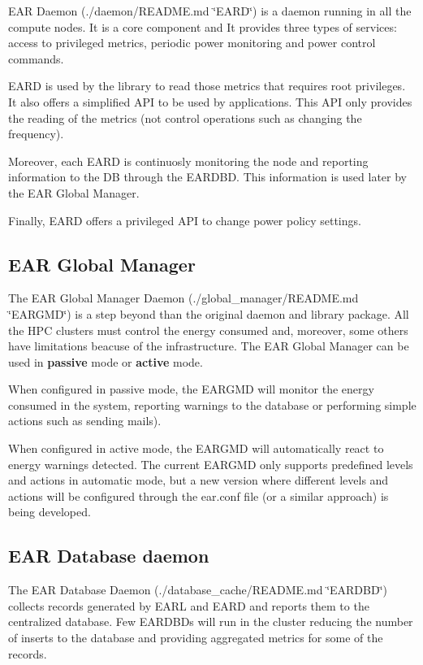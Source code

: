 E\+AR Daemon (./daemon/\+R\+E\+A\+D\+ME.md \char`\"{}\+E\+A\+R\+D\char`\"{}) is a daemon running in all the compute nodes. It is a core component and It provides three types of services\+: access to privileged metrics, periodic power monitoring and power control commands.

E\+A\+RD is used by the library to read those metrics that requires root privileges. It also offers a simplified A\+PI to be used by applications. This A\+PI only provides the reading of the metrics (not control operations such as changing the frequency).

Moreover, each E\+A\+RD is continuosly monitoring the node and reporting information to the DB through the E\+A\+R\+D\+BD. This information is used later by the E\+AR Global Manager.

Finally, E\+A\+RD offers a privileged A\+PI to change power policy settings.

\subsection*{E\+AR Global Manager}

The E\+AR Global Manager Daemon (./global\+\_\+manager/\+R\+E\+A\+D\+ME.md \char`\"{}\+E\+A\+R\+G\+M\+D\char`\"{}) is a step beyond than the original daemon and library package. All the H\+PC clusters must control the energy consumed and, moreover, some others have limitations beacuse of the infrastructure. The E\+AR Global Manager can be used in {\bfseries passive} mode or {\bfseries active} mode.

When configured in passive mode, the E\+A\+R\+G\+MD will monitor the energy consumed in the system, reporting warnings to the database or performing simple actions such as sending mails).

When configured in active mode, the E\+A\+R\+G\+MD will automatically react to energy warnings detected. The current E\+A\+R\+G\+MD only supports predefined levels and actions in automatic mode, but a new version where different levels and actions will be configured through the {\ttfamily ear.\+conf} file (or a similar approach) is being developed.

\subsection*{E\+AR Database daemon}

The E\+AR Database Daemon (./database\+\_\+cache/\+R\+E\+A\+D\+ME.md \char`\"{}\+E\+A\+R\+D\+B\+D\char`\"{}) collects records generated by E\+A\+RL and E\+A\+RD and reports them to the centralized database. Few E\+A\+R\+D\+BD\textquotesingle{}s will run in the cluster reducing the number of inserts to the database and providing aggregated metrics for some of the records.

